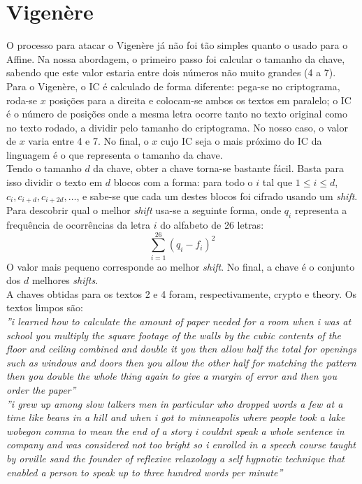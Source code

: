 \section{Vigenère}
O processo para atacar o Vigenère já não foi tão simples quanto o usado para o Affine. Na nossa abordagem, o primeiro passo foi calcular o tamanho da chave, sabendo que este valor estaria entre dois números não muito grandes (4 a 7). Para o Vigenère, o IC é calculado de forma diferente: pega-se no criptograma, roda-se $x$ posições para a direita e colocam-se ambos os textos em paralelo; o IC é o número de posições onde a mesma letra ocorre tanto no texto original como no texto rodado, a dividir pelo tamanho do criptograma. No nosso caso, o valor de $x$ varia entre 4 e 7. No final, o $x$ cujo IC seja o mais próximo do IC da linguagem é o que representa o tamanho da chave.\\
Tendo o tamanho $d$ da chave, obter a chave torna-se bastante fácil. Basta para isso dividir o texto em $d$ blocos com a forma: para todo o $i$ tal que $1 \leq i \leq d$, $c_i, c_{i+d}, c_{i+2d}, \dotsc$, e sabe-se que cada um destes blocos foi cifrado usando um \textit{shift}. Para descobrir qual o melhor \textit{shift} usa-se a seguinte forma, onde $q_i$ representa a frequência de ocorrências da letra $i$ do alfabeto de 26 letras:
\begin{equation*}
\sum_{i=1}^{26} (q_i - f_i)^2
\end{equation*}
O valor mais pequeno corresponde ao melhor \textit{shift}. No final, a chave é o conjunto dos $d$ melhores \textit{shifts}.\\
A chaves obtidas para os textos 2 e 4 foram, respectivamente, \textsf{crypto} e \textsf{theory}. Os textos limpos são:\\
\textit{''i learned how to calculate the amount of paper needed for a room when i was at school you multiply the square footage of the walls by the cubic contents of the floor and ceiling combined and double it you then allow half the total for openings such as windows and doors then you allow the other half for matching the pattern then you double the whole thing again to give a margin of error and then you order the paper''}\\
\textit{''i grew up among slow talkers men in particular who dropped words a few at a time like beans in a hill and when i got to minneapolis where people took a lake wobegon comma to mean the end of a story i couldnt speak a whole sentence in company and was considered not too bright so i enrolled in a speech course taught by orville sand the founder of reflexive relaxology a self hypnotic technique that enabled a person to speak up to three hundred words per minute''}
